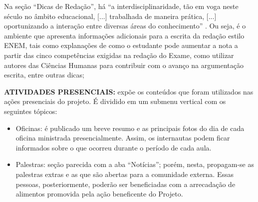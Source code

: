 \documentclass{textolivre}
\begin{document}
Na seção “Dicas de Redação”, há “a interdisciplinaridade, tão em voga neste século no âmbito educacional, [...] trabalhada de maneira prática, [...] oportunizando a interação entre diversas áreas do conhecimento” \cite[p. 39]{ferrari2017}. Ou seja, é o ambiente que apresenta informações adicionais para a escrita da redação estilo ENEM, tais como explanações de como o estudante pode aumentar a nota a partir das cinco competências exigidas na redação do Exame, como utilizar autores das Ciências Humanas para contribuir com o avanço na argumentação escrita, entre outras dicas;

\textbf{ATIVIDADES PRESENCIAIS:} expõe os conteúdos que foram utilizados nas ações presenciais do projeto. É dividido em um submenu vertical com os seguintes tópicos:

\begin{itemize}
\item Oficinas: é publicado um breve resumo e as principais fotos do dia de cada oficina ministrada presencialmente. Assim, os internautas podem ficar informados sobre o que ocorreu durante o período de cada aula.
\item Palestras: seção parecida com a aba “Notícias”; porém, nesta, propagam-se as palestras extras e as que são abertas para a comunidade externa. Essas pessoas, posteriormente, poderão ser beneficiadas com a arrecadação de alimentos promovida pela ação beneficente do Projeto.

\end{itemize}
\end{document}
